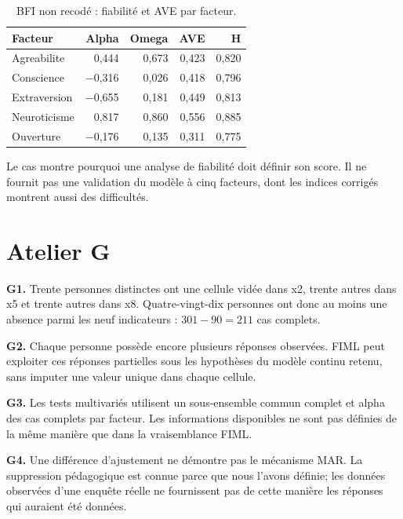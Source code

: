 \documentclass[
  french,
  11pt,
  a4paper,
  DIV=11,
  numbers=noendperiod]{scrreprt}
\begin{document}
{

\begin{longtable}[]{@{}lrrrr@{}}

\caption{\label{tbl-bfi-ref}BFI non recodé : fiabilité et AVE par
facteur.}

\tabularnewline

\toprule\noalign{}
Facteur & Alpha & Omega & AVE & H \\
\midrule\noalign{}
\endhead
\bottomrule\noalign{}
\endlastfoot
Agreabilite & 0,444 & 0,673 & 0,423 & 0,820 \\
Conscience & −0,316 & 0,026 & 0,418 & 0,796 \\
Extraversion & −0,655 & 0,181 & 0,449 & 0,813 \\
Neuroticisme & 0,817 & 0,860 & 0,556 & 0,885 \\
Ouverture & −0,176 & 0,135 & 0,311 & 0,775 \\

\end{longtable}

}

Le cas montre pourquoi une analyse de fiabilité doit définir son score.
Il ne fournit pas une validation du modèle à cinq facteurs, dont les
indices corrigés montrent aussi des difficultés.

\section{Atelier G}\label{atelier-g}

\textbf{G1.} Trente personnes distinctes ont une cellule vidée dans x2,
trente autres dans x5 et trente autres dans x8. Quatre-vingt-dix
personnes ont donc au moins une absence parmi les neuf indicateurs :
\(301-90=211\) cas complets.

\textbf{G2.} Chaque personne possède encore plusieurs réponses
observées. FIML peut exploiter ces réponses partielles sous les
hypothèses du modèle continu retenu, sans imputer une valeur unique dans
chaque cellule.

\textbf{G3.} Les tests multivariés utilisent un sous-ensemble commun
complet et alpha des cas complets par facteur. Les informations
disponibles ne sont pas définies de la même manière que dans la
vraisemblance FIML.

\textbf{G4.} Une différence d'ajustement ne démontre pas le mécanisme
MAR. La suppression pédagogique est connue parce que nous l'avons
définie; les données observées d'une enquête réelle ne fournissent pas
de cette manière les réponses qui auraient été données.
\end{document}
